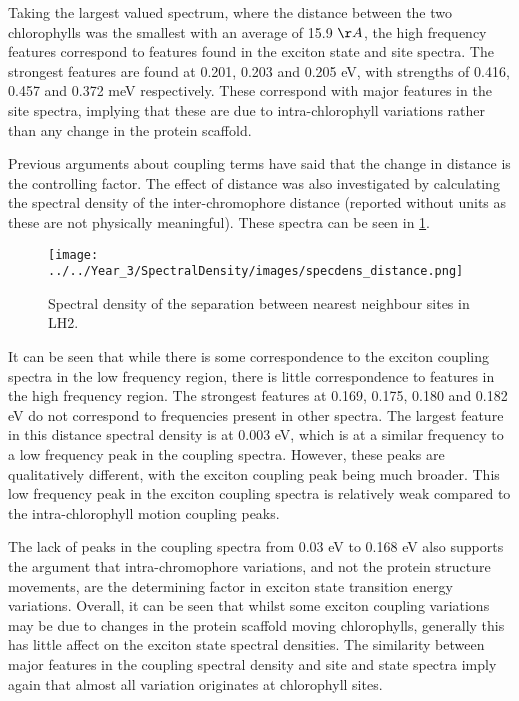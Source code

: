 Taking the largest valued spectrum, where the distance between the two chlorophylls
was the smallest with an average of 15.9 $\AA{}$, the high frequency features correspond 
to features found in the exciton state and site spectra. The strongest features are 
found at 0.201, 0.203 and 0.205 eV, with strengths of 0.416, 0.457 and 0.372 meV 
respectively. These correspond with major features in the site spectra, implying 
that these are due to intra-chlorophyll variations rather than any change in the
protein scaffold.

Previous arguments about coupling terms have said that the change in distance is
the controlling factor. The effect of distance was also investigated by calculating
the spectral density of the inter-chromophore distance (reported without units as 
these are not physically meaningful). These spectra can be seen in \ref{fig:specdens_distance}. 

\begin{figure}
    \centering
    \texttt{[image: ../../Year\_3/SpectralDensity/images/specdens\_distance.png]}
    \caption{Spectral density of the separation between nearest neighbour sites
    in LH2.}
    \label{fig:specdens_distance}
\end{figure}

It can be seen that while there is some correspondence to the exciton coupling spectra 
in the low frequency region, there is little correspondence to features in the high
frequency region. The strongest features at 0.169, 0.175, 0.180 and 0.182 eV do
not correspond to frequencies present in other spectra. The largest feature in
this distance spectral density is at 0.003 eV, which is at a similar frequency to a
low frequency peak in the coupling spectra. However, these peaks are qualitatively 
different, with the exciton coupling peak being much broader. This low frequency
peak in the exciton coupling spectra is relatively weak compared to the intra-chlorophyll
motion coupling peaks.

The lack of peaks in the coupling spectra from 0.03 eV to 0.168 eV also supports
the argument that intra-chromophore variations, and not the protein structure movements,
are the determining factor in exciton state transition energy variations. Overall,
it can be seen that whilst some exciton coupling variations may be due to changes 
in the protein scaffold moving chlorophylls, generally this has little affect on
the exciton state spectral densities. The similarity between major features in the
coupling spectral density and site and state spectra imply again that almost all
variation originates at chlorophyll sites.

